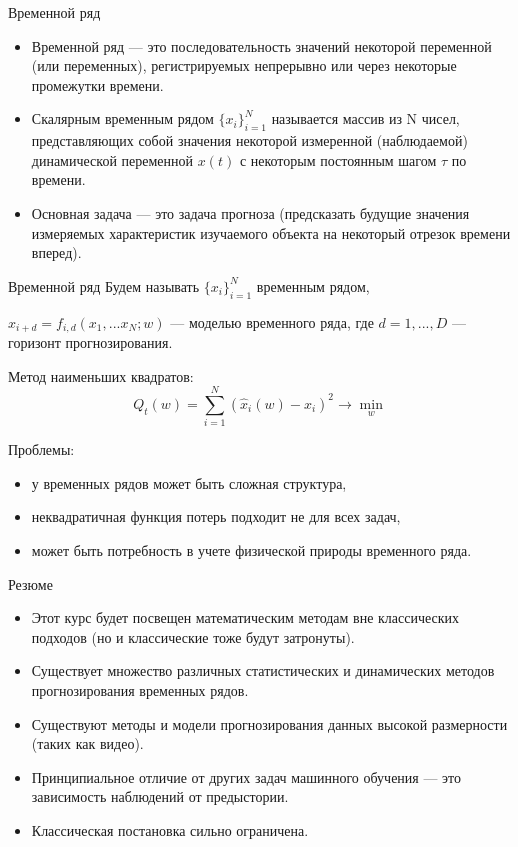\begin{frame}{Временной ряд}
\begin{itemize}
    \item Временной ряд --- это последовательность значений некоторой переменной (или переменных), регистрируемых непрерывно или через некоторые промежутки времени.
    
    \item Скалярным временным рядом $\{x_i\}_{i=1}^{N}$ называется массив из N чисел, представляющих собой значения некоторой измеренной (наблюдаемой) динамической переменной $x(t)$ с некоторым постоянным шагом $\tau$ по времени.

    \item Основная задача --- это задача прогноза (предсказать будущие значения измеряемых характеристик изучаемого объекта на некоторый отрезок времени вперед).
\end{itemize}
\end{frame}
\begin{frame}{Временной ряд}
Будем называть $\{x_i\}_{i=1}^{N}$ временным рядом,

$\hat{x}_{i+d} = f_{i,d}(x_1,...x_N;w)$ --- моделью временного ряда, где $d =1,...,D$ --- горизонт прогнозирования.

Метод наименьших квадратов:
    \begin{equation*}
        Q_t(w) = \sum_{i = 1}^{N}(\hat{x}_{i}(w) - x_i)^2 \rightarrow \min_w
    \end{equation*}

Проблемы:
\begin{itemize}
    \item у временных рядов может быть сложная структура,
    \item неквадратичная функция потерь подходит не для всех задач,
    \item может быть потребность в учете физической природы временного ряда.
\end{itemize}
\end{frame}
\begin{frame}{Резюме}
    \begin{itemize}
        \item Этот курс будет посвещен математическим методам вне классических подходов (но и классические тоже будут затронуты).
    	\item Существует множество различных статистических и динамических методов прогнозирования временных рядов.
        \item Существуют методы и модели прогнозирования данных высокой размерности (таких как видео).
        \item Принципиальное отличие от других задач машинного обучения --- это зависимость наблюдений от предыстории.
        \item Классическая постановка сильно ограничена.
    \end{itemize}
\end{frame}

 
